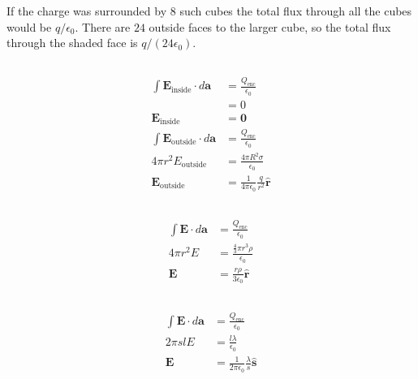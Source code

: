 \documentclass{article}
\renewcommand{\vec}[1]{\boldsymbol{\mathbf{#1}}}
\newcommand{\uvec}[1]{\hat{\vec{#1}}}
\newcommand{\ke}{\frac{1}{4 \pi \epsilon_0}}
\begin{document}
If the charge was surrounded by $8$ such cubes the total flux through all the cubes would be $q / \epsilon_0$. There are $24$ outside faces to the larger cube, so the total flux through the shaded face is $q / (24 \epsilon_0)$.

\subsection{}

\begin{align*}
  \int \vec{E}_\text{inside} \cdot d \vec{a}  & = \frac{Q_\text{enc}}{\epsilon_0}     \\
                                              & = 0                                   \\
  \vec{E}_\text{inside}                       & = \vec{0}                             \\
  \int \vec{E}_\text{outside} \cdot d \vec{a} & = \frac{Q_\text{enc}}{\epsilon_0}     \\
  4 \pi r^2 E_\text{outside}                  & = \frac{4 \pi R^2 \sigma}{\epsilon_0} \\
  \vec{E}_\text{outside}                      & = \ke \frac{q}{r^2} \uvec{r}
\end{align*}

\subsection{}

\begin{align*}
  \int \vec{E} \cdot d \vec{a} & = \frac{Q_\text{enc}}{\epsilon_0}             \\
  4 \pi r^2 E                  & = \frac{\frac{4}{3} \pi r^3 \rho}{\epsilon_0} \\
  \vec{E}                      & = \frac{r \rho}{3 \epsilon_0} \uvec{r}
\end{align*}

\subsection{}

\begin{align*}
  \int \vec{E} \cdot d \vec{a} & = \frac{Q_\text{enc}}{\epsilon_0}                       \\
  2 \pi s l E                  & = \frac{l \lambda}{\epsilon_0}                          \\
  \vec{E}                      & = \frac{1}{2 \pi \epsilon_0} \frac{\lambda}{s} \uvec{s}
\end{align*}
\end{document}
